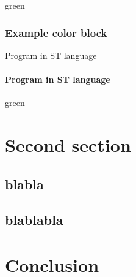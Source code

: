       \begin{colorbox}{}{green}
        
      \end{colorbox}

      \newpage
      \subsubsection{Example color block}

        \noindent \begin{exemple}{Program in ST language}
          
        \end{exemple}

        \paragraph*{Program in ST language}
        \noindent \begin{exemple*}
          
        \end{exemple*}

        \begin{colorbox}{}{green}
          
        \end{colorbox}

  \section{Second section}

    \subsection{blabla}
    \subsection{blablabla}

  \section{Conclusion}
